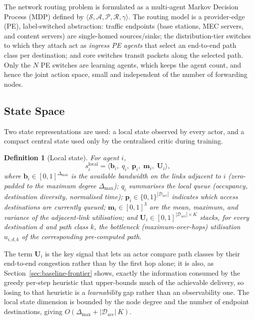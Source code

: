 \documentclass[10pt,journal,comsoc]{IEEEtran}
\newtheorem{definition}{Definition}
\begin{document}
The network routing problem is formulated as a multi-agent Markov Decision Process (MDP) defined by $\langle \mathcal{S}, \mathcal{A}, \mathcal{P}, \mathcal{R}, \gamma \rangle$. The routing model is a provider-edge (PE), label-switched abstraction: traffic endpoints (base stations, MEC servers, and content servers) are single-homed sources/sinks; the distribution-tier switches to which they attach act as \emph{ingress PE agents} that select an end-to-end path class per destination; and core switches transit packets along the selected path. Only the $N$ PE switches are learning agents, which keeps the agent count, and hence the joint action space, small and independent of the number of forwarding nodes.

\subsection{State Space}
Two state representations are used: a local state observed by every actor, and a compact central state used only by the centralised critic during training.

\begin{definition}[Local state]
  \label{local_state}
  For agent $i$,
  \[
    s_i^{\text{local}} = \big\langle \mathbf{b}_i,\; q_i,\; \mathbf{p}_i,\; \mathbf{m}_i,\; \mathbf{U}_i \big\rangle,
  \]
  where $\mathbf{b}_i \in [0,1]^{\Delta_{\max}}$ is the available bandwidth on the links adjacent to $i$ (zero-padded to the maximum degree $\Delta_{\max}$); $q_i$ summarises the local queue (occupancy, destination diversity, normalised time); $\mathbf{p}_i \in \{0,1\}^{|\mathcal{D}_{\text{acc}}|}$ indicates which access destinations are currently queued; $\mathbf{m}_i \in [0,1]^{3}$ are the mean, maximum, and variance of the adjacent-link utilisation; and $\mathbf{U}_i \in [0,1]^{|\mathcal{D}_{\text{acc}}|\times K}$ stacks, for every destination $d$ and path class $k$, the \emph{bottleneck} (maximum-over-hops) utilisation $u_{i,d,k}$ of the corresponding pre-computed path.
\end{definition}

The term $\mathbf{U}_i$ is the key signal that lets an actor compare path classes by their end-to-end congestion rather than by the first hop alone; it is also, as Section~\ref{sec:baseline-frontier} shows, exactly the information consumed by the greedy per-step heuristic that upper-bounds much of the achievable delivery, so losing to that heuristic is a \emph{learnability} gap rather than an observability one. The local state dimension is bounded by the node degree and the number of endpoint destinations, giving $O(\Delta_{\max} + |\mathcal{D}_{\text{acc}}|\,K)$.
\end{document}

